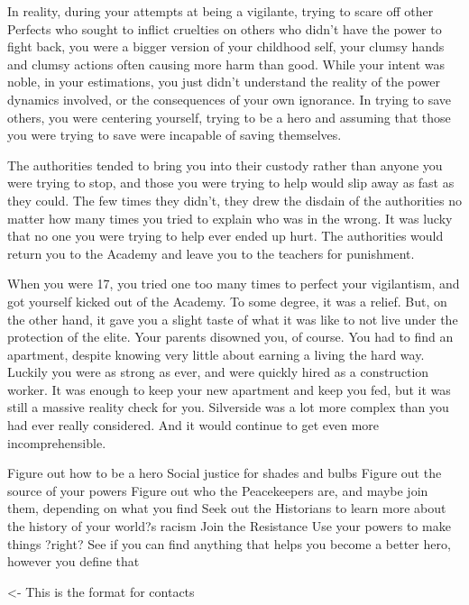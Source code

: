 \documentclass[char]{Silversiders}
\begin{document}
In reality, during your attempts at being a vigilante, trying to scare off other Perfects who sought to inflict cruelties on others who didn't have the power to fight back, you were a bigger version of your childhood self, your clumsy hands and clumsy actions often causing more harm than good. While your intent was noble, in your estimations, you just didn't understand the reality of the power dynamics involved, or the consequences of your own ignorance. In trying to save others, you were centering yourself, trying to be a hero and assuming that those you were trying to save were incapable of saving themselves.

The authorities tended to bring you into their custody rather than anyone you were trying to stop, and those you were trying to help would slip away as fast as they could. The few times they didn't, they drew the disdain of the authorities no matter how many times you tried to explain who was in the wrong. It was lucky that no one you were trying to help ever ended up hurt. The authorities would return you to the Academy and leave you to the teachers for punishment.

When you were 17, you tried one too many times to perfect your vigilantism, and got yourself kicked out of the Academy. To some degree, it was a relief. But, on the other hand, it gave you a slight taste of what it was like to not live under the protection of the elite. Your parents disowned you, of course. You had to find an apartment, despite knowing very little about earning a living the hard way. Luckily you were as strong as ever, and were quickly hired as a construction worker. It was enough to keep your new apartment and keep you fed, but it was still a massive reality check for you. Silverside was a lot more complex than you had ever really considered. And it would continue to get even more incomprehensible.

Figure out how to be a hero
Social justice for shades and bulbs
Figure out the source of your powers
Figure out who the Peacekeepers are, and maybe join them, depending on what you find
Seek out the Historians to learn more about the history of your world?s racism
Join the Resistance
Use your powers to make things ?right?
See if you can find anything that helps you become a better hero, however you define that

\begin{itemz}[Goals]
	\item 
\end{itemz}

\begin{itemz}[Notes]
	\item 
\end{itemz}

\begin{contacts}
	\contact{\cTest{}} <- This is the format for contacts 
\end{contacts}
\end{document}
